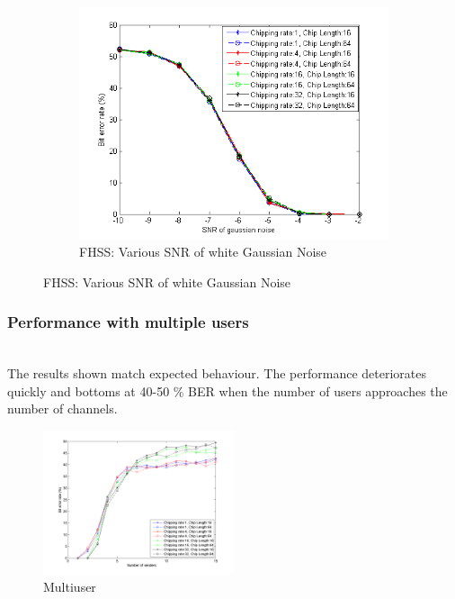 \begin{figure}[H]
\begin{subfigure}[b]{0.5\textwidth}
					\includegraphics[width=\textwidth]{imgs/results/plot_mode_fhss-test_gaussianSNR-rep_20-dataRate_8-dataLength_128_fixedlegend.png}
					\caption{FHSS: Various SNR of white Gaussian Noise}
					\label{fig:fhss_gaussian}
				\end{subfigure}
			\end{figure}
		
		\subsubsection{Performance with multiple users}~\\
			The results shown match expected behaviour. The performance deteriorates quickly and bottoms at 40-50 \% BER when the number of users approaches the number of channels.
			
			\begin{figure}[H]
			\centering
				\includegraphics[width=0.5\textwidth]{imgs/results/plot_mode_fhss-test_numSenders-rep_20-dataRate_8-dataLength_128.png}
				\caption{Multiuser}
				\label{fig:fhss_multiuser}
			\end{figure}